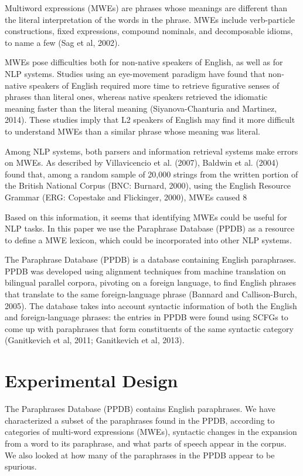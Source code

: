 \documentclass[11pt]{article}
\begin{document}
Multiword expressions (MWEs) are phrases whose meanings are different than the literal interpretation of the words in the phrase. MWEs include verb-particle constructions, fixed expressions, compound nominals, and decomposable idioms, to name a few (Sag et al, 2002). 

MWEs pose difficulties both for non-native speakers of English, as well as for NLP systems. Studies using an eye-movement paradigm have found that non-native speakers of English required more time to retrieve figurative senses of phrases than literal ones, whereas native speakers retrieved the idiomatic meaning faster than the literal meaning (Siyanova-Chanturia and Martinez, 2014). These studies imply that L2 speakers of English may find it more difficult to understand MWEs than a similar phrase whose meaning was literal.

Among NLP systems, both parsers and information retrieval systems make errors on MWEs. As described by Villavicencio et al. (2007), Baldwin et al. (2004) found that, among a random sample of 20,000 strings from the written portion of the British National Corpus (BNC: Burnard, 2000), using the English Resource Grammar (ERG: Copestake and Flickinger, 2000), MWEs caused 8%

Based on this information, it seems that identifying MWEs could be useful for NLP tasks. In this paper we use the Paraphrase Database (PPDB) as a resource to define a MWE lexicon, which could be incorporated into other NLP systems.

The Paraphrase Database (PPDB) is a database containing English paraphrases. PPDB was developed using alignment techniques from machine translation on bilingual parallel corpora, pivoting on a foreign language, to find English phrases that translate to the same foreign-language phrase (Bannard and Callison-Burch, 2005). The database takes into account syntactic information of both the English and foreign-language phrases: the entries in PPDB were found using SCFGs to come up with paraphrases that form constituents of the same syntactic category (Ganitkevich et al, 2011; Ganitkevich et al, 2013).

\section{Experimental Design}
The Paraphrases Database (PPDB) contains English paraphrases. We have characterized a subset of the paraphrases found in the PPDB, according to categories of multi-word expressions (MWEs), syntactic changes in the expansion from a word to its paraphrase, and what parts of speech appear in the corpus. We also looked at how many of the paraphrases in the PPDB appear to be spurious.
\end{document}
